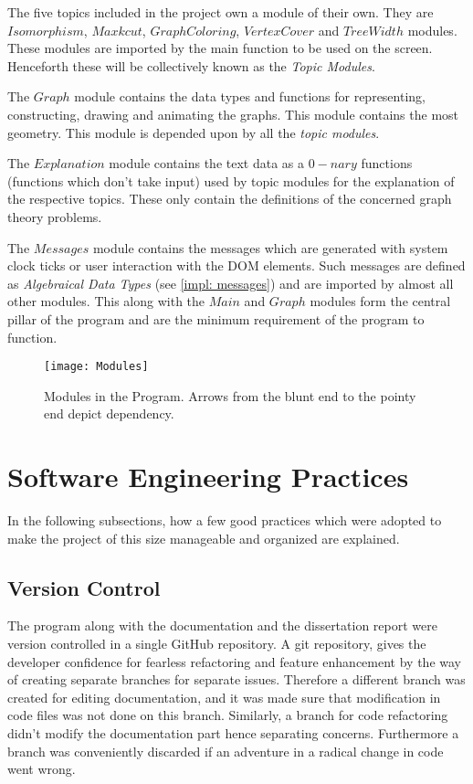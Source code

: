 The five topics included in the project own a module of their own. They are
$Isomorphism$, $Maxkcut$, $GraphColoring$, $VertexCover$ and $TreeWidth$ modules.
These modules are imported by the main function to be used on the screen.
Henceforth these will be collectively known as the \emph{Topic Modules}.

The $Graph$ module contains the data types and functions for representing,
constructing, drawing and animating the graphs. This module contains the most
geometry. This module is depended upon by all the \emph{topic modules}.

The $Explanation$ module contains the text data as a $0-nary$ functions
(functions which don't take input) used by topic modules for the explanation of
the respective topics. These only contain the definitions of the concerned
graph theory problems.

The $Messages$ module contains the messages which are generated with system
clock ticks or user interaction with the DOM elements.  Such messages are
defined as \emph{Algebraical Data Types} (see \autoref{impl: messages}) and are
imported by almost all other modules. This along with the $Main$ and $Graph$
modules form the central pillar of the program and are the minimum requirement
of the program to function.

\begin{figure}[h]
\centering
\texttt{[image: Modules]}
\caption{
        Modules in the Program. Arrows from the blunt end to
        the pointy end depict dependency.
        }
\end{figure}

\section{Software Engineering Practices}
In the following subsections, how a few good practices which were adopted to
make the project of this size manageable and organized are explained.

\subsection{Version Control}
The program along with the documentation and the dissertation report were
version controlled in a single GitHub repository. A git repository, gives the
developer confidence for fearless refactoring and feature enhancement by the
way of creating separate branches for separate issues. Therefore a different
branch was created for editing documentation, and it was made sure that
modification in code files was not done on this branch. Similarly, a branch for
code refactoring didn't modify the documentation part hence separating
concerns.  Furthermore a branch was conveniently discarded if an adventure in a
radical change in code went wrong.

